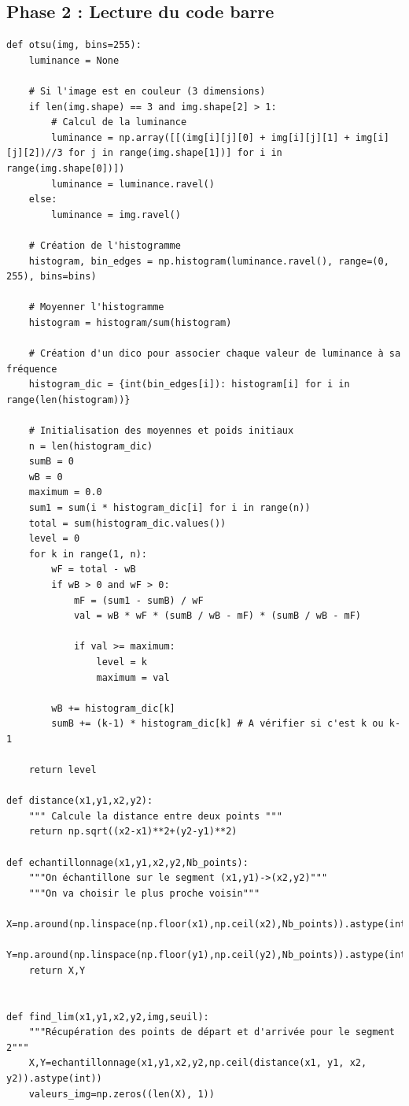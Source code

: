 \documentclass{rapport}
\begin{document}
\subsection{Phase 2 : Lecture du code barre}
\begin{lstlisting}
def otsu(img, bins=255):
	luminance = None
	
	# Si l'image est en couleur (3 dimensions)
	if len(img.shape) == 3 and img.shape[2] > 1:
		# Calcul de la luminance 
		luminance = np.array([[(img[i][j][0] + img[i][j][1] + img[i][j][2])//3 for j in range(img.shape[1])] for i in range(img.shape[0])])
		luminance = luminance.ravel()
	else:
		luminance = img.ravel()
	
	# Création de l'histogramme
	histogram, bin_edges = np.histogram(luminance.ravel(), range=(0, 255), bins=bins)
	
	# Moyenner l'histogramme
	histogram = histogram/sum(histogram)    
	
	# Création d'un dico pour associer chaque valeur de luminance à sa fréquence
	histogram_dic = {int(bin_edges[i]): histogram[i] for i in range(len(histogram))}
	
	# Initialisation des moyennes et poids initiaux
	n = len(histogram_dic)
	sumB = 0
	wB = 0
	maximum = 0.0
	sum1 = sum(i * histogram_dic[i] for i in range(n))
	total = sum(histogram_dic.values())
	level = 0
	for k in range(1, n):
		wF = total - wB
		if wB > 0 and wF > 0:
			mF = (sum1 - sumB) / wF
			val = wB * wF * (sumB / wB - mF) * (sumB / wB - mF)
			
			if val >= maximum:
				level = k
				maximum = val
		
		wB += histogram_dic[k]
		sumB += (k-1) * histogram_dic[k] # A vérifier si c'est k ou k-1
	
	return level

def distance(x1,y1,x2,y2):
	""" Calcule la distance entre deux points """
	return np.sqrt((x2-x1)**2+(y2-y1)**2)

def echantillonnage(x1,y1,x2,y2,Nb_points):
	"""On échantillone sur le segment (x1,y1)->(x2,y2)"""
	"""On va choisir le plus proche voisin"""
	X=np.around(np.linspace(np.floor(x1),np.ceil(x2),Nb_points)).astype(int)
	Y=np.around(np.linspace(np.floor(y1),np.ceil(y2),Nb_points)).astype(int)
	return X,Y


def find_lim(x1,y1,x2,y2,img,seuil):
    """Récupération des points de départ et d'arrivée pour le segment 2"""
    X,Y=echantillonnage(x1,y1,x2,y2,np.ceil(distance(x1, y1, x2, y2)).astype(int))
    valeurs_img=np.zeros((len(X), 1))


\end{lstlisting}
\end{document}
